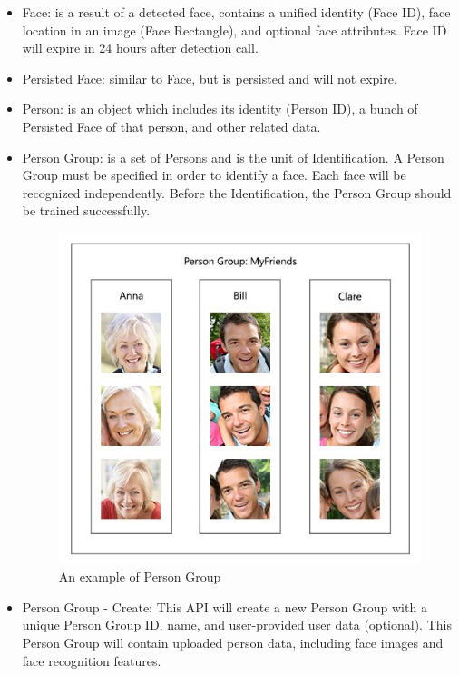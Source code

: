 \begin{itemize}
\item Face: is a result of a detected face, contains a unified identity (Face ID), face location in an image (Face Rectangle), and optional face attributes. Face ID will expire in 24 hours after detection call.
\item Persisted Face: similar to Face, but is persisted and will not expire.
\item Person: is an object which includes its identity (Person ID), a bunch of Persisted Face of that person, and other related data.
\item Person Group: is a set of Persons and is the unit of Identification. A Person Group must be specified in order to identify a face. Each face will be recognized independently. Before the Identification, the Person Group should be trained successfully.
\begin{center}
    \begin{figure}[H]
    \centering
    \includegraphics[width=1\columnwidth]{images/chap4/face-api-person-group.jpg}
    \caption{An example of Person Group}
    \end{figure}
\end{center}
\item Person Group - Create: This API will create a new Person Group with a unique Person Group ID, name, and user-provided user data (optional). This Person Group will contain uploaded person data, including face images and face recognition features.

\end{itemize}
